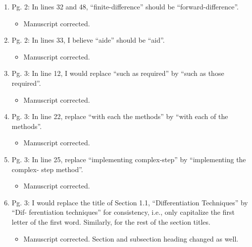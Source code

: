 \documentclass{article}
\begin{document}
\begin{enumerate}
\begin{enumerate}
 \item Pg. 2: In lines 32 and 48, “ﬁnite-difference” should be “forward-difference”.

{\color{red}  
\begin{itemize}
     \item
      Manuscript corrected.
  \end{itemize}}

 \item Pg. 2: In lines 33, I believe “aide” should be “aid”.

{\color{red}  
\begin{itemize}
     \item
    Manuscript corrected.
  \end{itemize}}

 \item Pg. 3: In line 12, I would replace “such as required” by “such as those required”.

{\color{red}  
\begin{itemize}
     \item
    Manuscript corrected.
  \end{itemize}}

 \item Pg. 3: In line 22, replace “with each the methods” by “with each of the methods”.

{\color{red}  
\begin{itemize}
     \item
 Manuscript corrected. 
  \end{itemize}}

 \item Pg. 3: In line 25, replace “implementing complex-step” by “implementing the complex-
step method”.

{\color{red}  
\begin{itemize}
     \item
 Manuscript corrected. 
  \end{itemize}}

 \item Pg. 3: I would replace the title of Section 1.1, “Differentiation Techniques” by “Dif-
ferentiation techniques” for consistency, i.e., only capitalize the ﬁrst letter of the ﬁrst
word. Similarly, for the rest of the section titles.

{\color{red}  
\begin{itemize}
     \item
 Manuscript corrected. Section and subsection heading changed as well.
  \end{itemize}}


\end{enumerate}
\end{enumerate}
\end{document}
